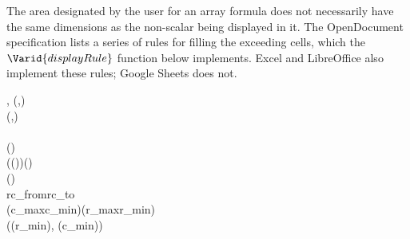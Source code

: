 The area designated by the user for an array formula does not necessarily have
the same dimensions as the non-scalar being displayed in it. The OpenDocument
specification lists a series of rules for filling the exceeding cells, which
the \ensuremath{\Varid{displayRule}} function below implements. Excel and LibreOffice also
implement these rules; Google Sheets does not.

\begin{hscode}\SaveRestoreHook
{}%
%
%
%
%
%
%
%
%
%
%
%
%
\>[B]{}\mathbin{::}\llparenthesis \cdot , \cdot \rrparenthesis \to (,)\to {}\to {}\<[E]%
\\
\>[B]{}\;\;(,)\;\mathrel{=}{}\<[E]%
\\
\>[B]{}\<[4]%
\>[4]{}\;\;\<[E]%
\\
\>[4]{}\<[7]%
\>[7]{}\;(\;)\to {}\<[E]%
\\
\>[7]{}\<[10]%
\>[10]{}\;\;\;(\;\;\;(\;\;))\;(\;)\;{}\<[E]%
\\
\>[10]{}\<[22]%
\>[22]{}(\lambda {}\;\to {}\mathbin{\$}\mathbin{!!}\mathbin{!!}){}\<[E]%
\\
\>[4]{}\<[7]%
\>[7]{}\;rc_{from}\;rc_{to}\to {}\<[E]%
\\
\>[7]{}\<[10]%
\>[10]{}\;\;\;(\mathbin{+}c_{max}\mathbin{-}c_{min})\;(\mathbin{+}r_{max}\mathbin{-}r_{min})\;{}\<[E]%
\\
\>[10]{}\<[22]%
\>[22]{}(\lambda {}\;\to {}\;\llparenthesis \langle (r_{min}\mathbin{+})\rangle , \langle (c_{min}\mathbin{+})\rangle \rrparenthesis ){}\<[E]%

\end{hscode}
